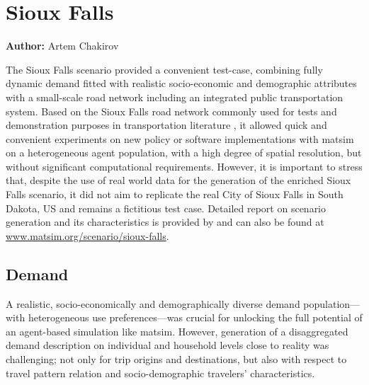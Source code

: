 \section{Sioux Falls}
\label{ch:scenarios:siouxfalls}
\hfill \textbf{Author:} Artem Chakirov


The Sioux Falls scenario provided a convenient test-case, combining fully dynamic demand fitted with realistic socio-economic and demographic attributes with a small-scale road network including an integrated public transportation system. Based on the Sioux Falls road network commonly used for tests and demonstration purposes in transportation literature \citep[][]{BarGera_TNTP_Webpage_2013}, it allowed quick and convenient experiments on new policy or software implementations with \gls{matsim} on a heterogeneous agent population, with a high degree of spatial resolution, but without significant computational requirements. However, it is important to stress that, despite the use of real world data for the generation of the enriched Sioux Falls scenario, it did not aim to replicate the real City of Sioux Falls in South Dakota, US and remains a fictitious test case. Detailed report on scenario generation and its characteristics is provided by \citet[][]{ChakirovFourie_TechRep_FCL_2014} and can also be found at \url{www.matsim.org/scenario/sioux-falls}. 

\subsection{Demand}
A realistic, socio-economically and demographically diverse demand population---with  heterogeneous use preferences---was crucial for unlocking the full potential of an agent-based simulation like \gls{matsim}. However, generation of a disaggregated demand description on individual and household levels close to reality was challenging; not only for trip origins and destinations, but also with respect to travel pattern relation and socio-demographic travelers' characteristics.

